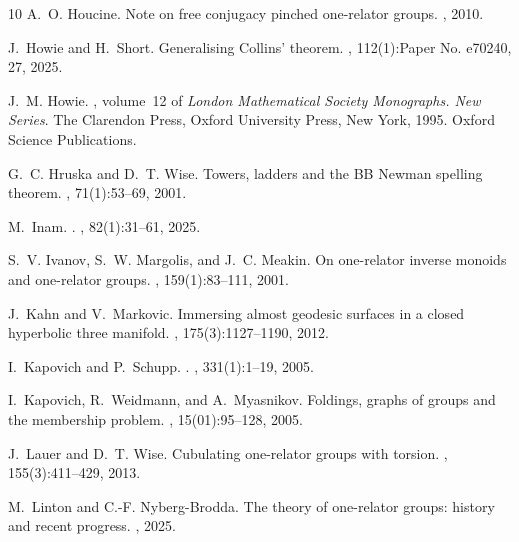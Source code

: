 \documentclass[11pt]{amsart}
\theoremstyle{plain}
\theoremstyle{definition}
\begin{document}
\begin{thebibliography}{10}
A.~O. Houcine.
\newblock Note on free conjugacy pinched one-relator groups.
,
  2010.

J.~Howie and H.~Short.
\newblock Generalising {C}ollins' theorem.
, 112(1):Paper No. e70240, 27, 2025.

J.~M. Howie.
, volume~12 of {\em London
  Mathematical Society Monographs. New Series}.
\newblock The Clarendon Press, Oxford University Press, New York, 1995.
\newblock Oxford Science Publications.

G.~C. Hruska and D.~T. Wise.
\newblock Towers, ladders and the {BB} {N}ewman spelling theorem.
, 71(1):53--69, 2001.

M.~Inam.
.
, 82(1):31--61, 2025.

S.~V. Ivanov, S.~W. Margolis, and J.~C. Meakin.
\newblock On one-relator inverse monoids and one-relator groups.
, 159(1):83--111, 2001.

J.~Kahn and V.~Markovic.
\newblock Immersing almost geodesic surfaces in a closed hyperbolic three
  manifold.
, 175(3):1127--1190, 2012.

I.~Kapovich and P.~Schupp.
.
, 331(1):1--19, 2005.

I.~Kapovich, R.~Weidmann, and A.~Myasnikov.
\newblock Foldings, graphs of groups and the membership problem.
, 15(01):95--128, 2005.

J.~Lauer and D.~T. Wise.
\newblock Cubulating one-relator groups with torsion.
, 155(3):411–429, 2013.

M.~Linton and C.-F. Nyberg-Brodda.
\newblock The theory of one-relator groups: history and recent progress.
, 2025.


\end{thebibliography}
\end{document}
